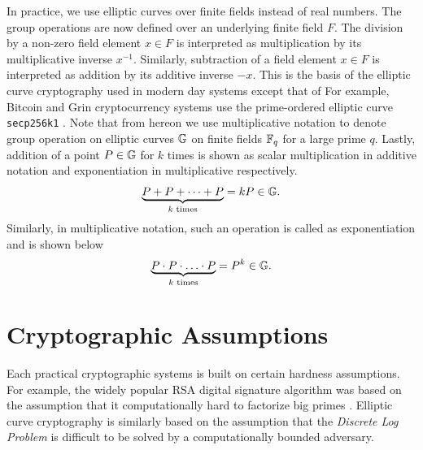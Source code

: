 In practice, we use elliptic curves over finite fields instead of real numbers.
The group operations are now defined over an underlying finite field $F$. 
The division by a non-zero field element $x \in F$ is interpreted as multiplication by its multiplicative inverse $x^{-1}$.
Similarly, subtraction of a field element $x \in F$ is interpreted as addition by its additive inverse $-x$.
This is the basis of the elliptic curve cryptography used in modern day systems except that of 
For example, Bitcoin and Grin cryptocurrency systems use the prime-ordered elliptic curve \texttt{secp256k1} \cite{Hess2000}.
Note that from hereon we use multiplicative notation to denote group operation on elliptic curves $\mathbb{G}$ on finite fields $\mathbb{F}_q$ for a large prime $q$. 
Lastly, addition of a point $P \in \mathbb{G}$ for $k$ times is shown as scalar multiplication in additive notation and exponentiation in multiplicative respectively.
\begin{equation*}
    \underbrace{P + P + \dots + P}_{k \text{ times}} = kP \in \mathbb{G}.
\end{equation*}
Similarly, in multiplicative notation, such an operation is called as exponentiation and is shown below 
\begin{equation*}
    \underbrace{P \cdot P \cdot \ldots \cdot P}_{k \text{ times}} = P^k \in \mathbb{G}.
\end{equation*}

\section{Cryptographic Assumptions}
\label{scn:assumptions}

Each practical cryptographic systems is built on certain hardness assumptions.
For example, the widely popular RSA digital signature algorithm was based on the assumption that it computationally hard to factorize big primes \cite{RSA1978}.  
Elliptic curve cryptography is similarly based on the assumption that the \textit{Discrete Log Problem} is difficult to be solved by a computationally bounded adversary.



